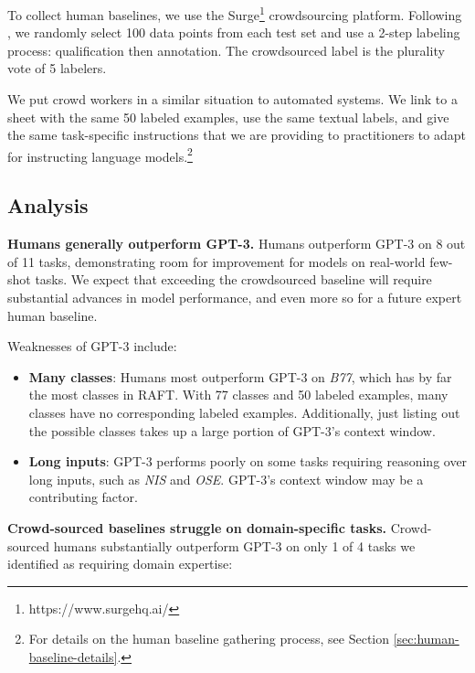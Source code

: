 \documentclass{article}
\newcommand{\name}{\textsc{RAFT}}
\begin{document}
To collect human baselines, we use the Surge\footnote{https://www.surgehq.ai/} crowdsourcing platform. Following \citet{wang2019superglue}, we randomly select 100 data points from each test set and use a 2-step labeling process: qualification then annotation. The crowdsourced label is the plurality vote of 5 labelers.

We put crowd workers in a similar situation to automated systems. We link to a sheet with the same 50 labeled examples, use the same textual labels, and give the same task-specific instructions that we are providing to practitioners to adapt for instructing language models.\footnote{For details on the human baseline gathering process, see Section \ref{sec:human-baseline-details}.}

\subsection{Analysis}
\begin{comment}
Wide-ranging results indicating varying levels of difficulty
[Insert things about in which areas LMs are still much worse than humans]
\end{comment}

\textbf{Humans generally outperform GPT-3.} Humans outperform GPT-3 on 8 out of 11 tasks, demonstrating room for improvement for models on real-world few-shot tasks. We expect that exceeding the crowdsourced baseline will require substantial advances in model performance, and even more so for a future expert human baseline.

Weaknesses of GPT-3 include:

\begin{itemize}
    \item \textbf{Many classes}: Humans most outperform GPT-3 on \textit{B77}, which has by far the most classes in \name{}. With 77 classes and 50 labeled examples, many classes have no corresponding labeled examples. Additionally, just listing out the possible classes takes up a large portion of GPT-3's context window.
    \item \textbf{Long inputs}: GPT-3 performs poorly on some tasks requiring reasoning over long inputs, such as \textit{NIS} and \textit{OSE}. GPT-3's context window may be a contributing factor.
\end{itemize}

\textbf{Crowd-sourced baselines struggle on domain-specific tasks.} 
Crowd-sourced humans substantially outperform GPT-3 on only 1 of 4 tasks we identified as requiring domain expertise:
\end{document}
